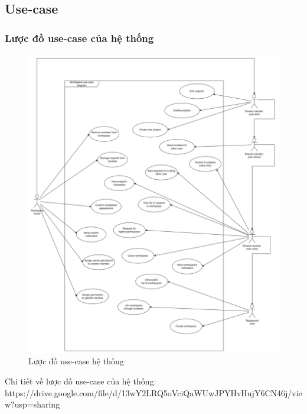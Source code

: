 \subsection{Use-case}
\subsubsection{Lược đồ use-case của hệ thống}

\begin{figure}[H]
    \begin{center}
        \includegraphics[width=1\textwidth]{Content/Phân tích và thiết kế hệ thống/documents/Use case/images/System usecase.png}
        \vspace{0.5cm}
        \caption{Lược đồ use-case hệ thống}
        \label{fig: Lược đồ use-case hệ thống}
    \end{center}
\end{figure}

Chi tiết về lược đồ use-case của hệ thống: 
\newline
https://drive.google.com/file/d/13wY2LRQ5oVciQaWUwJPYHvHujY6CN46j/view?usp=sharing  

